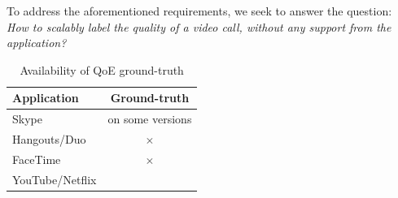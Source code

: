 To address the aforementioned requirements, we seek to answer the question: {\em How to scalably label the quality of a video call, without any support from the application?}

\begin{table}[t]
	\centering
			\begin{tabular}{l|c}
				\hline \hline
				\textbf{Application} & \textbf{Ground-truth} \\
				\hline
				\hline
				Skype & \checkmark *on some versions \\  \hline
				Hangouts/Duo & $\times$ \\ \hline
				FaceTime & $\times$ \\ \hline
				YouTube/Netflix & \checkmark \\ \hline 
			\end{tabular} 
		\hfill 
		\caption{Availability of QoE ground-truth}
		\label{tab:table1} 
\end{table}
